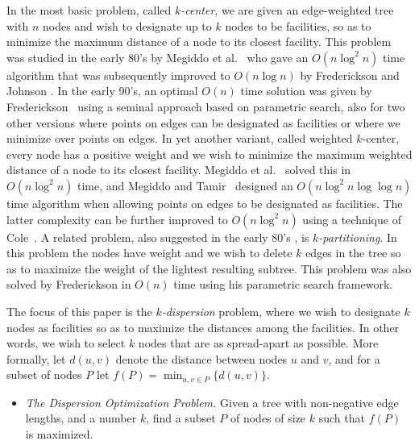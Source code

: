 \documentclass[a4paper,UKenglish]{lipics-v2016}
\theoremstyle{plain}
\newcommand{\Oh}{{O}}
\begin{document}
In the most basic problem, called \emph{$k$-center}, we are given an edge-weighted tree with $n$ nodes and wish to designate up to $k$ nodes to be facilities, so as to minimize the maximum distance of a node to its closest facility. This problem was studied in the early 80's by Megiddo et al.~\cite{Megiddo1981} who gave an $\Oh(n\log^2n)$ time algorithm that was subsequently improved to $\Oh(n\log n)$ by Frederickson and Johnson \cite{Frederickson1983}.
In the early 90's, an optimal $\Oh(n)$ time solution was given by Frederickson~\cite{Frederickson1991a,Frederickson1990} using a seminal approach based on
parametric search, also for two other versions where points on edges can be designated as facilities or where we minimize over points on edges.
In yet another variant, called weighted $k$-center, every node has a positive weight and we wish to minimize the maximum weighted distance of a node to its closest facility. Megiddo et al.~\cite{Megiddo1981} solved this in $\Oh(n\log^{2}n)$ time, and
Megiddo and Tamir~\cite{Megiddo1983} designed an $\Oh(n\log^{2}n\log\log n)$ time algorithm when allowing points on edges to be
designated as facilities. The latter complexity can be further improved to $\Oh(n\log^{2}n)$ using a technique of Cole~\cite{Cole87}. 
%
A related problem, also suggested in the early 80's  \cite{Becker1982,Perl1981}, is \emph{$k$-partitioning}. In this problem the nodes have weight and we wish to delete $k$ edges in the tree so as to maximize the weight of the lightest resulting subtree. This problem was also solved by Frederickson in $\Oh(n)$ time \cite{Frederickson1991} using his parametric search framework. 
%


The focus of this paper is the  {\em $k$-dispersion} problem, where we wish to designate $k$ nodes as facilities so as to maximize the distances among the facilities. In other words, we wish to select $k$ nodes that are as spread-apart as possible. More formally, let $d(u,v)$ denote the distance between nodes $u$ and $v$, and for a subset of nodes $P$ let $f(P)=\min_{u,v\in P} \{d(u,v)\}$.

\begin{itemize} 
\item {\em The Dispersion Optimization Problem.} Given a tree with non-negative edge lengths, and a number $k$, find a subset $P$ of nodes of size $k$ such that $f(P)$ is maximized.
\end{itemize}
\end{document}
